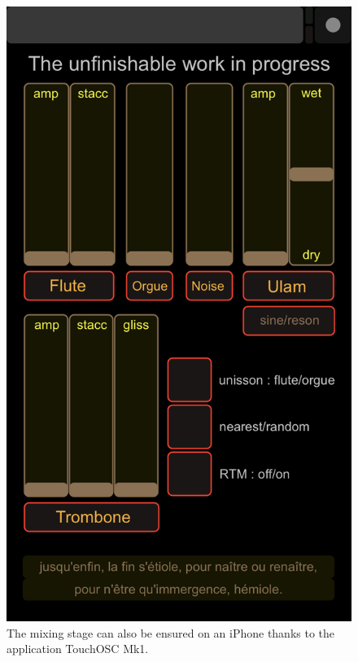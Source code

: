 \documentclass{article}
\begin{document}
\begin{figure}[H]
\centering
\includegraphics[width=\textwidth/2]{../img/9930}
\caption*{The mixing stage can also be ensured on an iPhone thanks to the application TouchOSC Mk1\protect\footnotemark.}
\label{iphonemix}
\end{figure}

\end{document}
